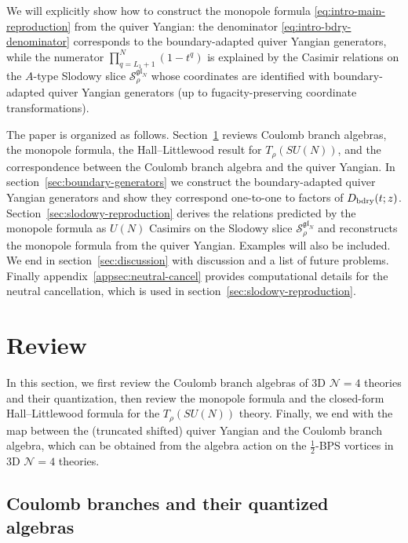 \documentclass[12pt,a4paper]{article}
\begin{document}
\noindent We will explicitly show how to construct the monopole formula \eqref{eq:intro-main-reproduction} from the quiver Yangian: the denominator \eqref{eq:intro-bdry-denominator} corresponds to the boundary-adapted quiver Yangian generators, while the numerator $\prod_{q=L_1+1}^{N}(1-t^q)$ is explained by the Casimir relations on the $A$-type Slodowy slice $\mathcal{S}^{\mathfrak{gl}_N}_\rho$ whose coordinates are identified with boundary-adapted quiver Yangian generators (up to fugacity-preserving coordinate transformations).


\medskip

The paper is organized as follows.  Section~\ref{sec:review} reviews Coulomb 
branch algebras, the monopole formula, the Hall--Littlewood result for
$T_\rho(SU(N))$, and the correspondence between the Coulomb branch algebra and the quiver Yangian.  In
section~\ref{sec:boundary-generators} we 
construct the boundary-adapted quiver Yangian generators  and show they correspond one-to-one to factors of $D_{\rm bdry}(t;z)$.  Section~\ref{sec:slodowy-reproduction} derives the relations predicted by the monopole formula as $U(N)$ Casimirs on the Slodowy slice $\mathcal{S}^{\mathfrak{gl}_N}_\rho$ and reconstructs the
monopole formula from the quiver Yangian. Examples will also be included. We end in section~\ref{sec:discussion} with discussion and a list of future problems. Finally appendix~\ref{appsec:neutral-cancel} provides computational details for the neutral cancellation, which is used in section~\ref{sec:slodowy-reproduction}.



 \section{Review}
\label{sec:review}


In this section, we first
review the Coulomb branch algebras of 3D $\mathcal N=4$ theories and their quantization, then review the monopole formula and the closed-form Hall--Littlewood formula for the $T_\rho(SU(N))$ theory. Finally, we end with the map between the (truncated shifted) quiver Yangian and the Coulomb branch algebra, which can be obtained from the algebra action on the $\frac{1}{2}$-BPS vortices in 3D $\mathcal N=4$ theories.


\subsection{Coulomb branches and their quantized algebras}
\label{subsec:review-coulomb}
\end{document}
